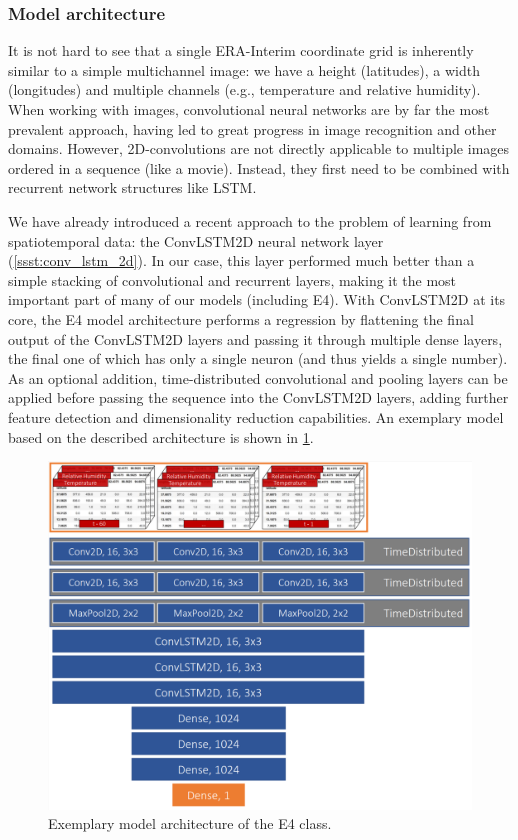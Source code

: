\clearpage
\subsubsection{Model architecture}
It is not hard to see that a single ERA-Interim coordinate grid is inherently similar to a simple multichannel image: we have a height (latitudes), a width (longitudes) and multiple channels (e.g., temperature and relative humidity). When working with images, convolutional neural networks are by far the most prevalent approach, having led to great progress in image recognition and other domains. However, 2D-convolutions are not directly applicable to multiple images ordered in a sequence (like a movie). Instead, they first need to be combined with recurrent network structures like LSTM.

We have already introduced a recent approach to the problem of learning from spatiotemporal data: the ConvLSTM2D neural network layer (\cref{ssst:conv_lstm_2d}). In our case, this layer performed much better than a simple stacking of convolutional and recurrent layers, making it the most important part of many of our models (including E4). With ConvLSTM2D at its core, the E4 model architecture performs a regression by flattening the final output of the ConvLSTM2D layers and passing it through multiple dense layers, the final one of which has only a single neuron (and thus yields a single number). As an optional addition, time-distributed convolutional and pooling layers can be applied before passing the sequence into the ConvLSTM2D layers, adding further feature detection and dimensionality reduction capabilities. An exemplary model based on the described architecture is shown in \cref{fig:e4_architecture}.

\begin{figure}[h]
  \centering
  \includegraphics[width=0.8\linewidth]{./99_appendix/img/E4_architecture}
  \caption{Exemplary model architecture of the E4 class.}
  \label{fig:e4_architecture}
\end{figure}

